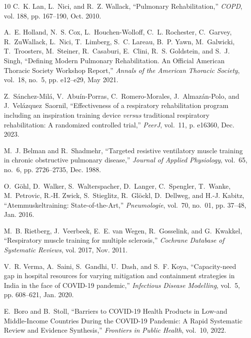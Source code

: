 \documentclass{ieeeaccess}
\begin{document}
{\begin{thebibliography}{10}
C.~K. Lan, L.~Nici, and R.~Z. Wallack, ``Pulmonary {{Rehabilitation}},'' \emph{COPD}, vol. 188, pp. 167--190, Oct. 2010.

A.~E. Holland, N.~S. Cox, L.~{Houchen-Wolloff}, C.~L. Rochester, C.~Garvey, R.~ZuWallack, L.~Nici, T.~Limberg, S.~C. Lareau, B.~P. Yawn, M.~Galwicki, T.~Troosters, M.~Steiner, R.~Casaburi, E.~Clini, R.~S. Goldstein, and S.~J. Singh, ``Defining {{Modern Pulmonary Rehabilitation}}. {{An Official American Thoracic Society Workshop Report}},'' \emph{Annals of the American Thoracic Society}, vol.~18, no.~5, pp. e12--e29, May 2021.

Z.~{S{\'a}nchez-Mil{\'a}}, V.~{Abu{\'i}n-Porras}, C.~{Romero-Morales}, J.~{Almaz{\'a}n-Polo}, and J.~Vel{\'a}zquez~Saornil, ``Effectiveness of a respiratory rehabilitation program including an inspiration training device {\emph{versus}} traditional respiratory rehabilitation: A randomized controlled trial,'' \emph{PeerJ}, vol.~11, p. e16360, Dec. 2023.

M.~J. Belman and R.~Shadmehr, ``Targeted resistive ventilatory muscle training in chronic obstructive pulmonary disease,'' \emph{Journal of Applied Physiology}, vol.~65, no.~6, pp. 2726--2735, Dec. 1988.

O.~G{\"o}hl, D.~Walker, S.~Walterspacher, D.~Langer, C.~Spengler, T.~Wanke, M.~Petrovic, R.-H. Zwick, S.~Stieglitz, R.~Gl{\"o}ckl, D.~Dellweg, and H.-J. Kabitz, ``{Atemmuskeltraining: State-of-the-Art},'' \emph{Pneumologie}, vol.~70, no.~01, pp. 37--48, Jan. 2016.

M.~B. Rietberg, J.~Veerbeek, E.~E. {van Wegen}, R.~Gosselink, and G.~Kwakkel, ``Respiratory muscle training for multiple sclerosis,'' \emph{Cochrane Database of Systematic Reviews}, vol. 2017, Nov. 2011.

V.~R. Verma, A.~Saini, S.~Gandhi, U.~Dash, and S.~F. Koya, ``Capacity-need gap in hospital resources for varying mitigation and containment strategies in {{India}} in the face of {{COVID-19}} pandemic,'' \emph{Infectious Disease Modelling}, vol.~5, pp. 608--621, Jan. 2020.

E.~Boro and B.~Stoll, ``Barriers to {{COVID-19 Health Products}} in {{Low-and Middle-Income Countries During}} the {{COVID-19 Pandemic}}: {{A Rapid Systematic Review}} and {{Evidence Synthesis}},'' \emph{Frontiers in Public Health}, vol.~10, 2022.


\end{thebibliography}}
\end{document}
